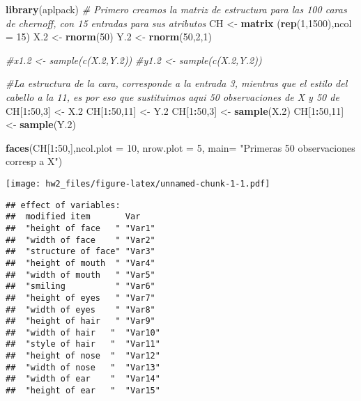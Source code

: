 \documentclass[]{article}
\newenvironment{Shaded}{\begin{snugshade}}{\end{snugshade}}
\newcommand{\CommentTok}[1]{\textcolor[rgb]{0.56,0.35,0.01}{\textit{#1}}}
\newcommand{\DataTypeTok}[1]{\textcolor[rgb]{0.13,0.29,0.53}{#1}}
\newcommand{\DecValTok}[1]{\textcolor[rgb]{0.00,0.00,0.81}{#1}}
\newcommand{\FloatTok}[1]{\textcolor[rgb]{0.00,0.00,0.81}{#1}}
\newcommand{\KeywordTok}[1]{\textcolor[rgb]{0.13,0.29,0.53}{\textbf{#1}}}
\newcommand{\NormalTok}[1]{#1}
\newcommand{\OperatorTok}[1]{\textcolor[rgb]{0.81,0.36,0.00}{\textbf{#1}}}
\newcommand{\StringTok}[1]{\textcolor[rgb]{0.31,0.60,0.02}{#1}}
\begin{document}
\begin{Shaded}
\begin{Highlighting}[]
\KeywordTok{library}\NormalTok{(aplpack)}
\CommentTok{# Primero creamos la matriz de estructura para las 100 caras de chernoff, con 15 entradas para sus atributos}
\NormalTok{CH <-}\StringTok{ }\KeywordTok{matrix}\NormalTok{ (}\KeywordTok{rep}\NormalTok{(}\DecValTok{1}\NormalTok{,}\DecValTok{1500}\NormalTok{),}\DataTypeTok{ncol =} \DecValTok{15}\NormalTok{)}
\NormalTok{X}\FloatTok{.2}\NormalTok{ <-}\StringTok{ }\KeywordTok{rnorm}\NormalTok{(}\DecValTok{50}\NormalTok{)}
\NormalTok{Y}\FloatTok{.2}\NormalTok{ <-}\StringTok{ }\KeywordTok{rnorm}\NormalTok{(}\DecValTok{50}\NormalTok{,}\DecValTok{2}\NormalTok{,}\DecValTok{1}\NormalTok{)}

\CommentTok{#x1.2 <- sample(c(X.2,Y.2))}
\CommentTok{#y1.2 <- sample(c(X.2,Y.2))}

\CommentTok{#La estructura de la cara, corresponde a la entrada 3, mientras que el estilo del cabello a la 11, es por eso que sustituimos aqui 50 observaciones de X y 50 de }
\NormalTok{CH[}\DecValTok{1}\OperatorTok{:}\DecValTok{50}\NormalTok{,}\DecValTok{3}\NormalTok{] <-}\StringTok{ }\NormalTok{X}\FloatTok{.2}
\NormalTok{CH[}\DecValTok{1}\OperatorTok{:}\DecValTok{50}\NormalTok{,}\DecValTok{11}\NormalTok{] <-}\StringTok{ }\NormalTok{Y}\FloatTok{.2}
\NormalTok{CH[}\DecValTok{1}\OperatorTok{:}\DecValTok{50}\NormalTok{,}\DecValTok{3}\NormalTok{] <-}\StringTok{ }\KeywordTok{sample}\NormalTok{(X}\FloatTok{.2}\NormalTok{)}
\NormalTok{CH[}\DecValTok{1}\OperatorTok{:}\DecValTok{50}\NormalTok{,}\DecValTok{11}\NormalTok{] <-}\StringTok{ }\KeywordTok{sample}\NormalTok{(Y}\FloatTok{.2}\NormalTok{)}


\KeywordTok{faces}\NormalTok{(CH[}\DecValTok{1}\OperatorTok{:}\DecValTok{50}\NormalTok{,],}\DataTypeTok{ncol.plot =} \DecValTok{10}\NormalTok{, }\DataTypeTok{nrow.plot =} \DecValTok{5}\NormalTok{, }\DataTypeTok{main=} \StringTok{"Primeras 50 observaciones corresp a X"}\NormalTok{)}
\end{Highlighting}
\end{Shaded}

\texttt{[image: hw2\_files/figure-latex/unnamed-chunk-1-1.pdf]}

\begin{verbatim}
## effect of variables:
##  modified item       Var    
##  "height of face   " "Var1" 
##  "width of face    " "Var2" 
##  "structure of face" "Var3" 
##  "height of mouth  " "Var4" 
##  "width of mouth   " "Var5" 
##  "smiling          " "Var6" 
##  "height of eyes   " "Var7" 
##  "width of eyes    " "Var8" 
##  "height of hair   " "Var9" 
##  "width of hair   "  "Var10"
##  "style of hair   "  "Var11"
##  "height of nose  "  "Var12"
##  "width of nose   "  "Var13"
##  "width of ear    "  "Var14"
##  "height of ear   "  "Var15"
\end{verbatim}
\end{document}
